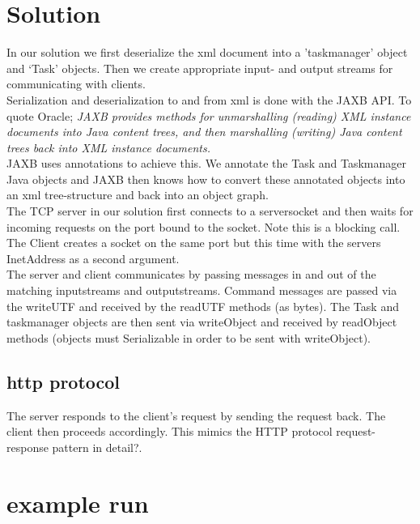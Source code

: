 \section{Solution}
\label{tcp_solution}

In our solution we first deserialize the xml document into a 'taskmanager' object and ‘Task’ objects. Then we create appropriate input- and output streams for communicating with clients. \\

Serialization and deserialization to and from xml is done with the JAXB API. To quote Oracle; \textit{JAXB provides methods for unmarshalling (reading) XML instance documents into Java content trees, and then marshalling (writing) Java content trees back into XML instance documents.} \\

JAXB uses annotations to achieve this. We annotate the Task and Taskmanager  Java objects and JAXB then knows how to convert these annotated objects into an xml tree-structure and back into an object graph.\\

The TCP server in our solution first connects to a serversocket and then waits for incoming requests on the port bound to the socket. Note this is a blocking call. The Client creates a socket on the same port but this time with the servers InetAddress as a second argument. \\

The server and client communicates by passing messages in and out of the matching inputstreams and outputstreams. Command messages are passed via the writeUTF and received by the readUTF methods (as bytes). The Task and taskmanager objects are then sent via writeObject and received by readObject methods (objects must Serializable in order to be sent with writeObject). \\

\subsection{http protocol}

The server responds to the client’s request by sending the request back. The client then proceeds accordingly. This mimics the HTTP protocol request-response pattern in detail?.

\section{example run}
\label{tcp_example}

